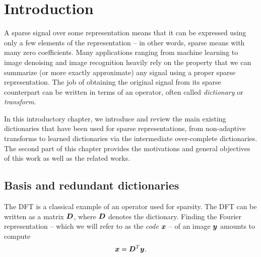 \tableofcontents



\chapter{Introduction}

A sparse signal over some representation means that it can be expressed using only a few elements of the representation – in other words, sparse means with many zero coefficients. Many applications ranging from machine learning to image denoising and image recognition heavily rely on the property that we can summarize (or more exactly approximate) any signal using a proper sparse representation. The job of obtaining the original signal from its sparse counterpart can be written in terms of an operator, often called \emph{dictionary} or \emph{transform}. 

\noindent
In this introductory chapter, we introduce and review the main existing dictionaries that have been used for sparse representations, from non-adaptive transforms to learned dictionaries via the intermediate over-complete dictionaries. The second part of this chapter provides the motivations and general objectives of this work as well as the related works.

\section{Basis and redundant dictionaries}

The \ac{DFT} is a classical example of an operator used for sparsity. The \ac{DFT} can be written as a matrix $\bm{D}$, where $\bm{D}$ denotes the dictionary. Finding the Fourier representation – which we will refer to as the \emph{code} $\bm{x}$ – of an image $\bm{y}$ amounts to compute 
\begin{equation}\bm{x} = \bm{D}^T\bm{y}.\label{eq_matrixvector}\end{equation}

